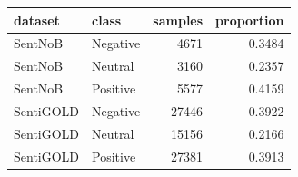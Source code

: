 \begin{tabular}{llrr}
\toprule
dataset & class & samples & proportion \\
\midrule
SentNoB & Negative & 4671 & 0.3484 \\
SentNoB & Neutral & 3160 & 0.2357 \\
SentNoB & Positive & 5577 & 0.4159 \\
SentiGOLD & Negative & 27446 & 0.3922 \\
SentiGOLD & Neutral & 15156 & 0.2166 \\
SentiGOLD & Positive & 27381 & 0.3913 \\
\bottomrule
\end{tabular}
